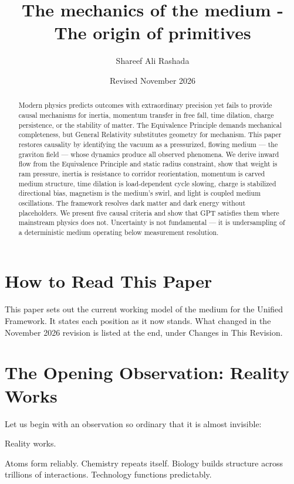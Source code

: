 \documentclass[12pt, a4paper]{article}
\title{The mechanics of the medium - The origin of primitives}
\author{Shareef Ali Rashada}
\date{Revised November 2026}
\begin{document}
\maketitle

\begin{abstract}
Modern physics predicts outcomes with extraordinary precision yet fails to provide causal mechanisms for inertia, momentum transfer in free fall, time dilation, charge persistence, or the stability of matter. The Equivalence Principle demands mechanical completeness, but General Relativity substitutes geometry for mechanism. This paper restores causality by identifying the vacuum as a pressurized, flowing medium — the graviton field — whose dynamics produce all observed phenomena. We derive inward flow from the Equivalence Principle and static radius constraint, show that weight is ram pressure, inertia is resistance to corridor reorientation, momentum is carved medium structure, time dilation is load-dependent cycle slowing, charge is stabilized directional bias, magnetism is the medium's swirl, and light is coupled medium oscillations. The framework resolves dark matter and dark energy without placeholders. We present five causal criteria and show that GPT satisfies them where mainstream physics does not. Uncertainty is not fundamental — it is undersampling of a deterministic medium operating below measurement resolution.
\end{abstract}

\tableofcontents

\newpage

\section*{How to Read This Paper}
This paper sets out the current working model of the medium for the Unified Framework. It states each position as it now stands. What changed in the November 2026 revision is listed at the end, under Changes in This Revision.

\statuskey

\section{The Opening Observation: Reality Works}
\label{sec:opening}

Let us begin with an observation so ordinary that it is almost invisible:

Reality works.

Atoms form reliably. Chemistry repeats itself. Biology builds structure across trillions of interactions. Technology functions predictably.
\end{document}
